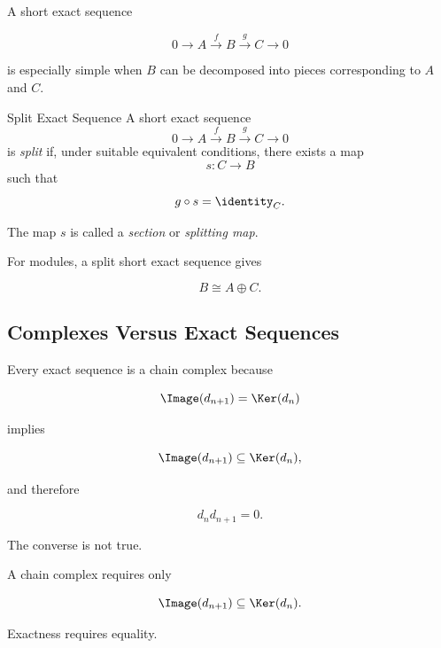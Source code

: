 A short exact sequence

\[ 0\to A\xrightarrow{f}B\xrightarrow{g}C\to0 \]

is especially simple when \(B\) can be decomposed into pieces corresponding
to \(A\) and \(C\).

\begin{definitionbox}{Split Exact Sequence}
A short exact sequence
\[ 0\to A\xrightarrow{f}B\xrightarrow{g}C\to0 \]
is \emph{split} if, under suitable equivalent conditions, there exists a map
\[ s:C\to B \]
such that
\[ g\circ s=\identity_C. \]
\end{definitionbox}

The map \(s\) is called a \emph{section} or \emph{splitting map}.

For modules, a split short exact sequence gives

\[ B\cong A\oplus C. \]

\subsection{Complexes Versus Exact Sequences}
\label{subsec:complexes-vs-exact}

Every exact sequence is a chain complex because

\[ \Image(d_{n+1})=\Ker(d_n) \]

implies

\[ \Image(d_{n+1})\subseteq\Ker(d_n), \]

and therefore

\[ d_nd_{n+1}=0. \]

The converse is not true.

A chain complex requires only

\[ \Image(d_{n+1})\subseteq\Ker(d_n). \]

Exactness requires equality.

\begin{center}
\end{center}

